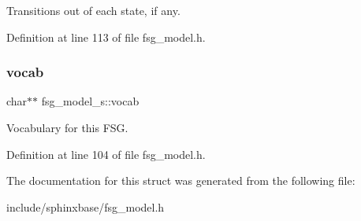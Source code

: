Transitions out of each state, if any. 



Definition at line 113 of file fsg\+\_\+model.\+h.

\mbox{\label{structfsg__model__s_a6bbfce2d672624d792ff964200a64031}} 
\subsubsection{vocab}
{\footnotesize\ttfamily char$\ast$$\ast$ fsg\+\_\+model\+\_\+s\+::vocab}



Vocabulary for this F\+SG. 



Definition at line 104 of file fsg\+\_\+model.\+h.



The documentation for this struct was generated from the following file\+:\begin{DoxyCompactItemize}
\item 
include/sphinxbase/fsg\+\_\+model.\+h\end{DoxyCompactItemize}
